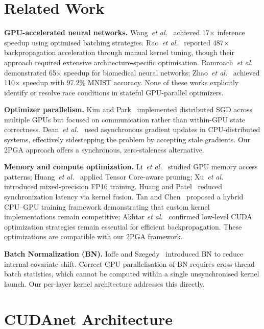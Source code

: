 \documentclass[runningheads]{llncs}
\begin{document}
\section{Related Work}

\textbf{GPU-accelerated neural networks.} Wang~\textit{et al.}~\cite{b4}
achieved 17$\times$ inference speedup using optimised batching strategies.
Rao~\textit{et al.}~\cite{b5} reported 487$\times$ backpropagation
acceleration through manual kernel tuning, though their approach required
extensive architecture-specific optimisation. Ramroach~\textit{et
al.}~\cite{b6} demonstrated 65$\times$ speedup for biomedical neural
networks; Zhao~\textit{et al.}~\cite{b14} achieved 110$\times$ speedup
with 97.2\% MNIST accuracy. None of these works explicitly identify or
resolve race conditions in stateful GPU-parallel optimizers.

\textbf{Optimizer parallelism.} Kim and Park~\cite{b13} implemented
distributed SGD across multiple GPUs but focused on communication rather
than within-GPU state correctness. Dean~\textit{et al.}~\cite{b10} used
asynchronous gradient updates in CPU-distributed systems, effectively
sidestepping the problem by accepting stale gradients. Our 2PGA approach
offers a synchronous, zero-staleness alternative.

\textbf{Memory and compute optimization.} Li~\textit{et al.}~\cite{b12}
studied GPU memory access patterns; Huang~\textit{et al.}~\cite{b11}
applied Tensor Core-aware pruning; Xu~\textit{et al.}~\cite{b15}
introduced mixed-precision FP16 training. Huang and Patel~\cite{b17}
reduced synchronization latency via kernel fusion. Tan and
Chen~\cite{b19} proposed a hybrid CPU--GPU training framework
demonstrating that custom kernel implementations remain competitive; Akhtar
\textit{et al.}~\cite{b20} confirmed low-level CUDA optimization strategies
remain essential for efficient backpropagation. These optimizations are
compatible with our 2PGA framework.

\textbf{Batch Normalization (BN).} Ioffe and Szegedy~\cite{b8} introduced
BN to reduce internal covariate shift. Correct GPU parallelisation of BN
requires cross-thread batch statistics, which cannot be computed within a
single unsynchronised kernel launch. Our per-layer kernel architecture
addresses this directly.

\section{CUDAnet Architecture}
\end{document}
